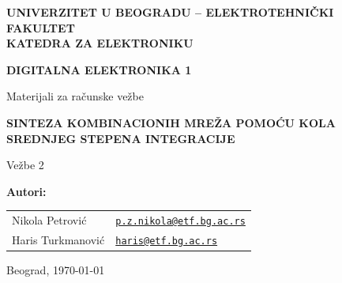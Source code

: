 \documentclass[a4paper,11pt]{article}
\numberwithin{equation}{section} %
\begin{document}
\begin{titlepage}
  \thispagestyle{empty}
  \begin{center}

    {\Large\bfseries
    UNIVERZITET U BEOGRADU -- ELEKTROTEHNIČKI FAKULTET\\
    KATEDRA ZA ELEKTRONIKU\par}

    \vspace{25mm}

    {\LARGE\bfseries DIGITALNA ELEKTRONIKA 1\par}
    \vspace{2mm}
    {\large Materijali za računske vežbe\par}

    \vspace{18mm}

    {\Large\bfseries
    SINTEZA KOMBINACIONIH MREŽA POMOĆU KOLA SREDNJEG
STEPENA INTEGRACIJE\par}
    \vspace{3mm}
    {\large Vežbe 2\par}

    \vfill

\begin{minipage}{0.62\linewidth}
  \raggedright
  \textbf{Autori:}\\[4pt]
  \small
  \begin{tabular}{@{}l l@{}}
    Nikola Petrović & \href{mailto:p.z.nikola@etf.bg.ac.rs}{\texttt{p.z.nikola@etf.bg.ac.rs}} \\
    Haris Turkmanović & \href{mailto:haris@etf.bg.ac.rs}{\texttt{haris@etf.bg.ac.rs}} \\
  \end{tabular}
\end{minipage}
\hfill
\begin{minipage}{0.34\linewidth}
  \raggedleft
  Beograd, \today
\end{minipage}

  \end{center}
\end{titlepage}


\tableofcontents
\newpage
\end{document}
